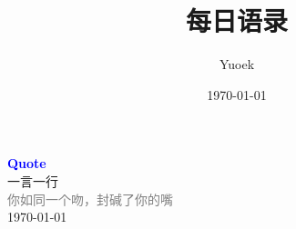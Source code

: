 \documentclass[UTF8, a4paper, 12pt]{ctexart}
\title{\Large 每日语录}
\author{Yuoek}
\date{\today}
\begin{document}
\thispagestyle{empty}
\maketitle
\clearpage

\tableofcontents
\clearpage

\thispagestyle{empty}
\vspace*{\fill}
\begin{center}
    \textcolor{blue}{\Huge\textbf{Quote}} \\[1em]
    \textcolor{blue!60!black}{\Large 一言一行} \\[2em]
    \textcolor{gray}{\large 你如同一个吻，封碱了你的嘴} \\[1em]
    \today
\end{center}
\vspace*{\fill}
\clearpage


\clearpage

\clearpage
\end{document}
